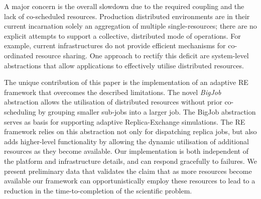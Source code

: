 \documentclass{rspublic}
\begin{document}
A major concern is the overall slowdown due to the required coupling 
and the lack of co-scheduled resources. Production distributed 
environments are in their current incarnation solely an aggregation
of multiple single-resources; there are no explicit attempts to
support a collective, distributed mode of operations.  For
example, current infrastructures do not provide efficient mechanisms for
co-ordinated resource sharing. One approach to rectify this deficit are
system-level abstractions that allow applications to 
effectively utilise distributed resources.

The unique contribution of this paper is the implementation of an adaptive RE
framework that overcomes the described limitations. The novel \emph{BigJob}
abstraction allows the utilisation of distributed resources
without prior co-scheduling by grouping smaller sub-jobs into a larger job. 
The BigJob abstraction serves as basis for supporting adaptive Replica-Exchange
simulations. The RE framework relies on this abstraction not only
for dispatching replica jobs, but also adds higher-level functionality by allowing
the dynamic utilisation of additional resources as they become available. 
Our implementation is both independent of the platform and 
infrastructure details, and can respond gracefully
to failures.  We present preliminary data that validates the
claim that as more resources become available our framework can
opportunistically employ these resources to lead to a reduction in
the time-to-completion of the scientific problem.



\end{document}
